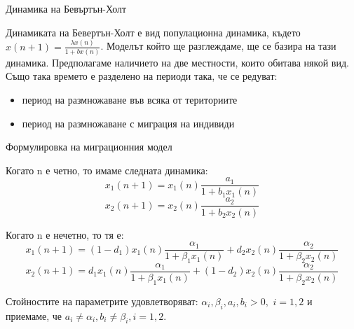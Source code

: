 
\begin{frame}[t]{Динамика на Бевъртън-Холт}

Динамиката на Бевертън-Холт е вид популационна динамика, където $x(n+1)=\frac{\lambda x(n)}{1+bx(n)}$. Моделът който ще разглеждаме, ще се базира на тази динамика. Предполагаме наличието на две местности, които обитава някой вид. Също така времето е разделено на периоди така, че се редуват:
\begin{itemize}
\item период на размножаване във всяка от териториите
\item период на размножаване с миграция на индивиди
\end{itemize}

\end{frame}


\begin{frame}[t]{Формулировка на миграционния модел}

Когато n е четно, то имаме следната динамика:
\[x_{1}(n+1)=x_{1}(n)\frac{a_{1}}{1+b_{1} x_{1}(n)}\]
\[x_{2}(n+1)=x_{2}(n)\frac{a_{2}}{1+b_{2} x_{2}(n)}\]

Когато n е нечетно, то тя е:
\[x_{1}(n+1)=(1-d_{1})x_{1}(n)\frac{\alpha_{1}}{1+\beta_{1} x_{1}(n)} + d_{2} x_{2}(n)\frac{\alpha_{2}}{1 + \beta_{2} x_{2}(n)}\]
\[x_{2}(n+1)=d_{1}x_{1}(n)\frac{\alpha_{1}}{1+\beta_{1} x_{1}(n)} + (1-d_{2}) x_{2}(n)\frac{\alpha_{2}}{1 + \beta_{2} x_{2}(n)}\]

Стойностите на параметрите удовлетворяват:
 $\alpha_{i},  \beta_{i}, a_{i}, b_{i} > 0,$ $i=1,2$ и приемаме, че $a_{i} \neq \alpha_{i}, b_{i} \neq \beta_{i}, i=1,2$.
 
\end{frame}